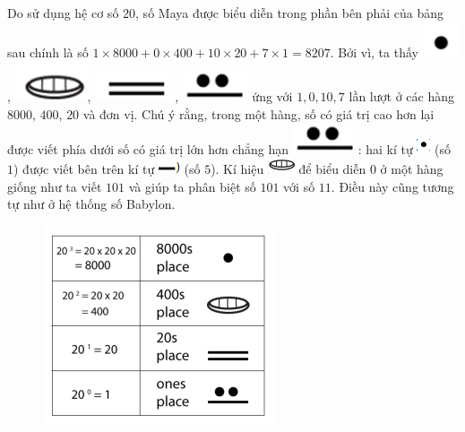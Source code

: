 	Do sử dụng hệ cơ số $20$,  số Maya được biểu diễn trong phần bên phải của bảng  sau chính là số  $1\times 8000+ 0\times 400+ 10\times20+ 7\times1= 8207$. Bởi vì, ta  thấy  \includegraphics[scale=0.5]{33},  \includegraphics[scale=0.5]{34},  \includegraphics[scale=0.5]{35}, \includegraphics[scale=0.5]{36}  ứng với $1, 0, 10, 7$  lần lượt ở các hàng $8000$, $400$, $20$ và đơn vị. Chú ý rằng, trong một hàng, số có giá trị cao hơn lại được viết phía dưới số có giá trị lớn hơn chẳng hạn  \includegraphics[scale=0.5]{36}:  hai kí tự \includegraphics{37} (số $1$) được viết bên trên kí tự \includegraphics{38} (số $5$). Kí hiệu \includegraphics{39} để biểu diễn $0$ ở một hàng giống như ta viết $101$ và giúp ta phân biệt số $101$ với số $11$. Điều này cũng tương tự như ở hệ thống số Babylon. 
	\vskip 0.1cm
	\begin{figure}
		\centering
		\vspace*{-20pt}
		\captionsetup{labelformat= empty, justification=centering}
		\includegraphics[width=0.95\linewidth]{32}
		\vspace*{-20pt}
	\end{figure}
